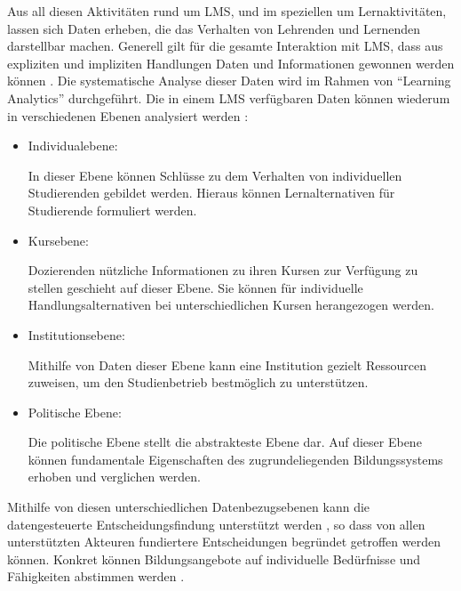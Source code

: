 Aus all diesen Aktivitäten rund um \ac{LMS}, und im speziellen um Lernaktivitäten, lassen sich Daten erheben, die das Verhalten von Lehrenden und Lernenden darstellbar machen. Generell gilt für die gesamte Interaktion mit \ac{LMS}, dass aus expliziten und impliziten Handlungen Daten und Informationen gewonnen werden können \autocite[S.26]{2012HorizonReport}. Die systematische Analyse dieser Daten wird im Rahmen von \enquote{Learning Analytics} durchgeführt. Die in einem \ac{LMS} verfügbaren Daten können wiederum in verschiedenen Ebenen analysiert werden \autocite[S.2f]{learningAnalyticsImHochschulkontext} \autocite{penetratingTheFogAnalyticsInLearningAndEducation}:

\begin{itemize}
	\item Individualebene: 
	
		In dieser Ebene können Schlüsse zu dem Verhalten von individuellen Studierenden gebildet werden. Hieraus können Lernalternativen für Studierende formuliert werden.
		
	\item Kursebene:
	
		Dozierenden nützliche Informationen zu ihren Kursen zur Verfügung zu stellen geschieht auf dieser Ebene. Sie können für individuelle Handlungsalternativen bei unterschiedlichen Kursen herangezogen werden. 
	
	\item Institutionsebene:
	
		Mithilfe von Daten dieser Ebene kann eine Institution gezielt Ressourcen zuweisen, um den Studienbetrieb bestmöglich zu unterstützen.  
	
	\item Politische Ebene:
	
		Die politische Ebene stellt die abstrakteste Ebene dar. Auf dieser Ebene können fundamentale Eigenschaften des zugrundeliegenden Bildungssystems erhoben und verglichen werden.
	
\end{itemize}

Mithilfe von diesen unterschiedlichen Datenbezugsebenen kann die datengesteuerte Entscheidungsfindung unterstützt werden \autocite[S.19]{theEvolutionOfBigDataAndLearningAnalyticsInAmericanHigherEducation}, so dass von allen unterstützten Akteuren fundiertere Entscheidungen begründet getroffen werden können. Konkret können Bildungsangebote auf individuelle Bedürfnisse und Fähigkeiten abstimmen werden \autocite[S.26]{2012HorizonReport}.

